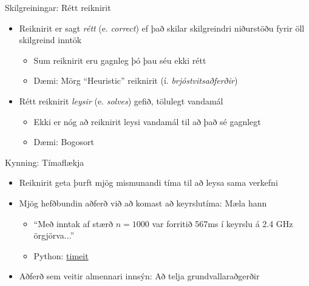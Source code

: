 \documentclass{beamer}
\begin{document}
\begin{frame}{Skilgreiningar: Rétt reiknirit}
\begin{itemize}
 \item Reiknirit er sagt \emph{rétt} (e. \emph{correct}) ef það skilar skilgreindri niðurstöðu fyrir öll skilgreind inntök
 \begin{itemize}
  \item Sum reiknirit eru gagnleg þó þau séu ekki rétt
  \item Dæmi: Mörg ``Heuristic'' reiknirit (í. \emph{brjóstvitsaðferðir})
 \end{itemize}
 \item Rétt reiknirit \emph{leysir} (e. \emph{solves}) gefið, tölulegt vandamál
 \begin{itemize}
  \item Ekki er nóg að reiknirit leysi vandamál til að það sé gagnlegt
  \item Dæmi: Bogosort
 \end{itemize}
\end{itemize}
\end{frame}

\begin{frame}{Kynning: Tímaflækja}
\begin{itemize}
 \item Reiknirit geta þurft mjög mismunandi tíma til að leysa sama verkefni
 \item Mjög hefðbundin aðferð við að komast að keyrslutíma: Mæla hann
 \begin{itemize}
  \item ``Með inntak af stærð $n = 1000$ var forritið 567ms í keyrslu á 2.4 GHz örgjörva...''
  \item Python: \href{http://docs.python.org/2/library/timeit.html}{timeit}
 \end{itemize}
 \item Aðferð sem veitir almennari innsýn: Að telja grundvallaraðgerðir
\end{itemize}
\end{frame}
\end{document}
